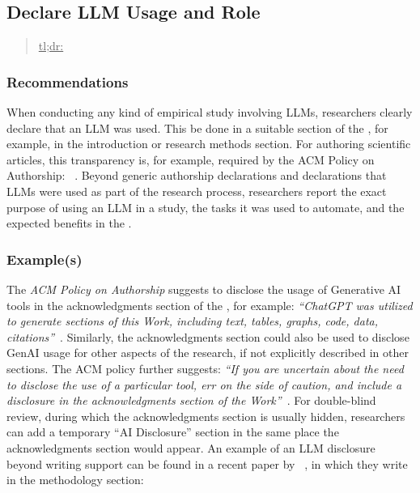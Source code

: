 



\subsection{Declare LLM Usage and Role}
\label{sec:declare-llm-usage-and-role}

\begin{quote}
\underline{tl;dr:}  
\end{quote}

\subsubsection{Recommendations}

When conducting any kind of empirical study involving LLMs, researchers \must clearly declare that an LLM was used.
This \should be done in a suitable section of the \paper, for example, in the introduction or research methods section.
For authoring scientific articles, this transparency is, for example, required by the ACM Policy on Authorship: ~\cite{ACM2023}.
Beyond generic authorship declarations and declarations that LLMs were used as part of the research process, researchers \should report the exact purpose of using an LLM in a study, the tasks it was used to automate, and the expected benefits in the \paper.

\subsubsection{Example(s)}

The \emph{ACM Policy on Authorship} suggests to disclose the usage of Generative AI tools in the acknowledgments section of the \paper, for example: \emph{``ChatGPT was utilized to generate sections of this Work, including text, tables, graphs, code, data, citations''}~\cite{ACM2023}. 
Similarly, the acknowledgments section could also be used to disclose GenAI usage for other aspects of the research, if not explicitly described in other sections.
The ACM policy further suggests: \emph{``If you are uncertain about the need to disclose the use of a particular tool, err on the side of caution, and include a disclosure in the acknowledgments section of the Work''}~\cite{ACM2023}.
For double-blind review, during which the acknowledgments section is usually hidden, researchers can add a temporary ``AI Disclosure'' section in the same place the acknowledgments section would appear. 
An example of an LLM disclosure beyond writing support can be found in a recent paper by \citeauthor{DBLP:conf/re/LubosFTGMEL24}~\cite{DBLP:conf/re/LubosFTGMEL24}, in which they write in the methodology section:

